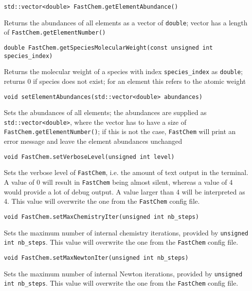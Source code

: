 \documentclass[numbers=noenddot]{fcmanual}
\newcommand{\fc}{\texttt{FastChem}\xspace}
\begin{document}
\lstinline!std::vector<double> FastChem.getElementAbundance()!
\begin{addmargin}[25pt]{0pt}
  Returns the abundances of all elements as a vector of \lstinline!double!; vector has a length of \lstinline!FastChem.getElementNumber()!
\end{addmargin}


\bigbreak

\lstinline!double FastChem.getSpeciesMolecularWeight(const unsigned int species_index)!
\begin{addmargin}[25pt]{0pt}
  Returns the molecular weight of a species with index \lstinline!species_index! as \lstinline!double!; returns 0 if species does not exist; for an element this refers to the atomic weight
\end{addmargin}


\bigbreak

\lstinline!void setElementAbundances(std::vector<double> abundances)!
\begin{addmargin}[25pt]{0pt}
  Sets the abundances of all elements; the abundances are supplied as \lstinline!std::vector<double>!, where the vector has to have a size of \lstinline!FastChem.getElementNumber()!; if this is not the case, \fc will print an error message and leave the element abundances unchanged
\end{addmargin}

\bigbreak

\lstinline!void FastChem.setVerboseLevel(unsigned int level)!
\begin{addmargin}[25pt]{0pt}
  Sets the verbose level of \fc, i.e. the amount of text output in the terminal. A value of 0 will result in \fc being almost silent, whereas a value of 4 would provide a lot of debug output. A value larger than 4 will be interpreted as 4. This value will overwrite the one from the \fc config file.
\end{addmargin}

\bigbreak

\lstinline!void FastChem.setMaxChemistryIter(unsigned int nb_steps)!
\begin{addmargin}[25pt]{0pt}
  Sets the maximum number of internal chemistry iterations, provided by \lstinline!unsigned int nb_steps!. This value will overwrite the one from the \fc config file.
\end{addmargin}

\bigbreak

\lstinline!void FastChem.setMaxNewtonIter(unsigned int nb_steps)!
\begin{addmargin}[25pt]{0pt}
  Sets the maximum number of internal Newton iterations, provided by \lstinline!unsigned int nb_steps!. This value will overwrite the one from the \fc config file.
\end{addmargin}
\end{document}
